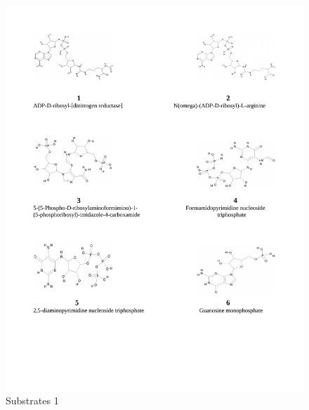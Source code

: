 \documentclass[12pt,twoside]{reedthesis}
\begin{document}
  \begin{figure}[h!tbp]
   \centering
   \includegraphics[angle = 0,scale = 1]{chapter4/esquema_quimico-1-1.pdf}
   \caption[Substrates 1]{\normalsize{Substrates 1}}
   \label{fig:Substrates chemical 1}
   \end{figure}
  
\end{document}

